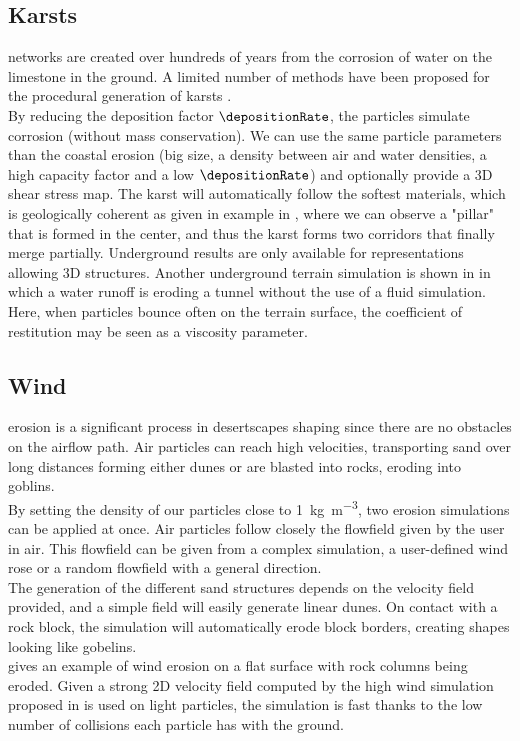 \subsection{Karsts} networks are created over hundreds of years from the corrosion of water on the limestone in the ground. A limited number of methods have been proposed for the procedural generation of karsts \cite{Paris2021}.\\ 
By reducing the deposition factor $\depositionRate$, the particles simulate corrosion (without mass conservation). We can use the same particle parameters than the coastal erosion (big size, a density between air and water densities, a high capacity factor and a low $\depositionRate$) and optionally provide a 3D shear stress map. The karst will automatically follow the softest materials, which is geologically coherent as given in example in , where we can observe a "pillar" that is formed in the center, and thus the karst forms two corridors that finally merge partially. 
%
Underground results are only available for representations allowing 3D structures. Another underground terrain simulation is shown in  in which a water runoff is eroding a tunnel without the use of a fluid simulation. Here, when particles bounce often on the terrain surface, the coefficient of restitution may be seen as a viscosity parameter.

\subsection{Wind}
erosion is a significant process in desertscapes shaping since there are no obstacles on the airflow path. Air particles can reach high velocities, transporting sand over long distances forming either dunes or are blasted into rocks, eroding into goblins. \\ 
By setting the density of our particles close to \SI{1}{\kilogram\per\cubic\meter}, two erosion simulations can be applied at once. Air particles follow closely the flowfield given by the user in air. This flowfield can be given from a complex simulation, a user-defined wind rose \cite{Paris2020} or a random flowfield with a general direction. \\ 
The generation of the different sand structures depends on the velocity field provided, and a simple field will easily generate linear dunes. On contact with a rock block, the simulation will automatically erode block borders, creating shapes looking like gobelins. \\
 gives an example of wind erosion on a flat surface with rock columns being eroded. Given a strong 2D velocity field computed by the high wind simulation proposed in \cite{Paris2020} is used on light particles, the simulation is fast thanks to the low number of collisions each particle has with the ground. 

